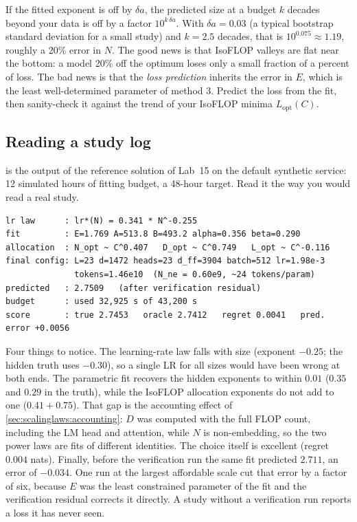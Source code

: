 \begin{napkinmath}
If the fitted exponent is off by $\delta a$, the predicted size at a budget $k$ decades beyond
your data is off by a factor $10^{k\,\delta a}$. With $\delta a=0.03$ (a typical bootstrap
standard deviation for a small study) and $k=2.5$ decades, that is $10^{0.075}\approx1.19$,
roughly a 20\% error in $N$. The good news is that IsoFLOP valleys are flat near the bottom: a model
20\% off the optimum loses only a small fraction of a percent of loss. The bad news is that the
\emph{loss prediction} inherits the error in $E$, which is the least well-determined parameter of
method 3. Predict the loss from the fit, then sanity-check it against the trend of your IsoFLOP minima
$L_{\text{opt}}(C)$.
\end{napkinmath}

\subsection{Reading a study log}\label{sec:scalinglaws:log}

 is the output of the reference solution of Lab~15 on the default
synthetic service: 12 simulated hours of fitting budget, a 48-hour target. Read it the way you
would read a real study.

\begin{lstlisting}[style=plain, caption={Output of \code{run.py study} (synthetic service, seed 0; numbers abridged).},label={lst:scalinglaws:log}]
lr law      : lr*(N) = 0.341 * N^-0.255
fit         : E=1.769 A=513.8 B=493.2 alpha=0.356 beta=0.290
allocation  : N_opt ~ C^0.407   D_opt ~ C^0.749   L_opt ~ C^-0.116
final config: L=23 d=1472 heads=23 d_ff=3904 batch=512 lr=1.98e-3
              tokens=1.46e10  (N_ne = 0.60e9, ~24 tokens/param)
predicted   : 2.7509   (after verification residual)
budget      : used 32,925 s of 43,200 s
score       : true 2.7453   oracle 2.7412   regret 0.0041   pred. error +0.0056
\end{lstlisting}

Four things to notice. The learning-rate law falls with size (exponent $-0.25$; the hidden truth
uses $-0.30$), so a single LR for all sizes would have been wrong at both ends. The parametric fit
recovers the hidden exponents to within $0.01$ ($0.35$ and $0.29$ in the truth), while the
IsoFLOP allocation exponents do not add to one ($0.41+0.75$). That gap is the accounting effect
of \cref{sec:scalinglaws:accounting}: $D$ was computed with the full FLOP count, including the LM
head and attention, while $N$ is non-embedding, so the two power laws are fits of different
identities. The choice itself is excellent (regret $0.004$ nats). Finally, before the
verification run the same fit predicted $2.711$, an error of $-0.034$. One run at the largest
affordable scale cut that error by a factor of six, because $E$ was the least constrained
parameter of the fit and the verification residual corrects it directly. A study without a
verification run reports a loss it has never seen.

